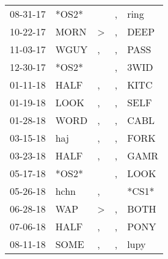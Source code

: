 \begin{supertabular}{p{0.07\textwidth}p{0.06\textwidth}p{0.02\textwidth}p{0.02\textwidth}p{0.06\textwidth}}
          08-31-17\textsuperscript{} &                            *OS2* &                  &                , &           ring\textsuperscript{} \\
          10-22-17\textsuperscript{} &           MORN\textsuperscript{} &     \textgreater &                , &           DEEP\textsuperscript{} \\
          11-03-17\textsuperscript{} &           WGUY\textsuperscript{} &                , &                , &           PASS\textsuperscript{} \\
          12-30-17\textsuperscript{} &                            *OS2* &                  &                , &           3WID\textsuperscript{} \\
          01-11-18\textsuperscript{} &           HALF\textsuperscript{} &                , &                , &           KITC\textsuperscript{} \\
          01-19-18\textsuperscript{} &           LOOK\textsuperscript{} &                , &                , &           SELF\textsuperscript{} \\
          01-28-18\textsuperscript{} &           WORD\textsuperscript{} &                , &                , &           CABL\textsuperscript{} \\
          03-15-18\textsuperscript{} &            haj\textsuperscript{} &                , &                , &           FORK\textsuperscript{} \\
          03-23-18\textsuperscript{} &           HALF\textsuperscript{} &                , &                , &           GAMR\textsuperscript{} \\
          05-17-18\textsuperscript{} &                            *OS2* &                  &                , &           LOOK\textsuperscript{} \\
          05-26-18\textsuperscript{} &           hchn\textsuperscript{} &                , &                  &                            *CS1* \\
          06-28-18\textsuperscript{} &            WAP\textsuperscript{} &     \textgreater &                , &           BOTH\textsuperscript{} \\
          07-06-18\textsuperscript{} &           HALF\textsuperscript{} &                , &                , &           PONY\textsuperscript{} \\
          08-11-18\textsuperscript{} &           SOME\textsuperscript{} &                , &                , &           lupy\textsuperscript{} \\

\end{supertabular}
